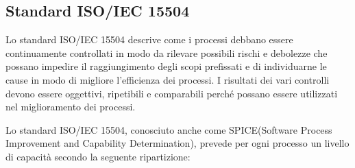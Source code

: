 \subsection{Standard ISO/IEC 15504}\label{15504}
Lo standard ISO/IEC 15504 descrive come i processi debbano essere continuamente controllati in modo da rilevare possibili rischi e debolezze che possano impedire il raggiungimento degli scopi prefissati e di individuarne le cause in modo di migliore l'efficienza dei processi. I risultati dei vari controlli devono essere oggettivi, ripetibili e comparabili perché possano essere utilizzati nel miglioramento dei processi.

\noindent Lo standard ISO/IEC 15504, conosciuto anche come SPICE(Software Process Improvement and Capability Determination), prevede per ogni processo un livello di capacità secondo la seguente ripartizione:

